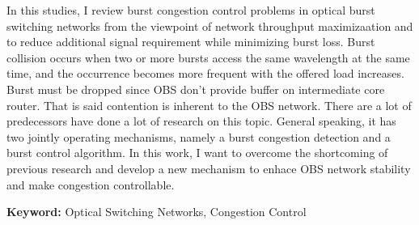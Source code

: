 


\begin{abstracts}        %

    In this studies, I review burst congestion control problems in optical burst switching networks from the viewpoint of network throughput maximizaation and to reduce additional signal requirement while minimizing burst loss. Burst collision occurs when two or more bursts access the same wavelength at the same time, and the occurrence becomes more frequent with the offered load increases. 
    Burst must be dropped since OBS don't provide buffer on intermediate core router. That is said contention is inherent to the OBS network. There are a lot of predecessors have done a lot of research on this topic. General speaking, it has two jointly operating mechanisms, namely a burst congestion detection and a burst control algorithm. In this work, I want to overcome the shortcoming of previous research and develop a new mechanism to enhace OBS network stability and make
    congestion controllable. 
    \par
    {\bfseries Keyword:} Optical Switching Networks, Congestion Control

\end{abstracts}




